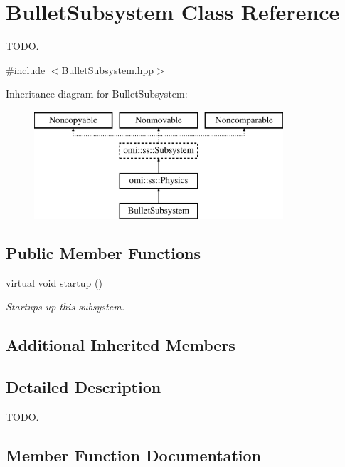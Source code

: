 \hypertarget{class_bullet_subsystem}{}\section{Bullet\+Subsystem Class Reference}
\label{class_bullet_subsystem}


T\+O\+DO.  




{\ttfamily \#include $<$Bullet\+Subsystem.\+hpp$>$}

Inheritance diagram for Bullet\+Subsystem\+:\begin{figure}[H]
\begin{center}
\leavevmode
\includegraphics[height=4.000000cm]{class_bullet_subsystem}
\end{center}
\end{figure}
\subsection*{Public Member Functions}
\begin{DoxyCompactItemize}
\item 
virtual void \hyperlink{class_bullet_subsystem_a3221cf461749b3b7a4a9a9784f06b5b4}{startup} ()
\begin{DoxyCompactList}\small\item\em Startups up this subsystem. \end{DoxyCompactList}\end{DoxyCompactItemize}
\subsection*{Additional Inherited Members}


\subsection{Detailed Description}
T\+O\+DO. 

\subsection{Member Function Documentation}

